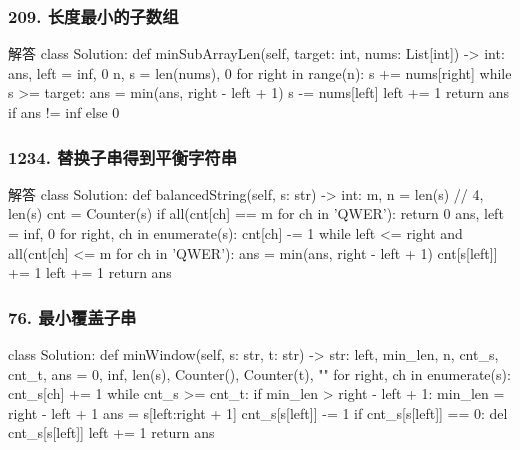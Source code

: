 \begin{frame}[fragile]          %
  \frametitle{\textsc{209. 长度最小的子数组}}
  \begin{codeblock}[language=python]{解答}
class Solution:
  def minSubArrayLen(self, target: int, nums: List[int]) -> int:
    ans, left = inf, 0
    n, s = len(nums), 0
    for right in range(n):
        s += nums[right]
        while s >= target:
            ans = min(ans, right - left + 1)
            s -= nums[left]
            left += 1
    return ans if ans != inf else 0
  \end{codeblock}
\end{frame}

\begin{frame}[fragile]          %
  \frametitle{\textsc{1234. 替换子串得到平衡字符串}}
  \begin{codeblock}[language=python]{解答}
class Solution:
  def balancedString(self, s: str) -> int:
    m, n = len(s) // 4, len(s)
    cnt = Counter(s)
    if all(cnt[ch] == m for ch in 'QWER'):
        return 0
    ans, left = inf, 0
    for right, ch in enumerate(s):
        cnt[ch] -= 1
        while left <= right and all(cnt[ch] <= m for ch in 'QWER'):
            ans = min(ans, right - left + 1)
            cnt[s[left]] += 1
            left += 1
    return ans
  \end{codeblock}
\end{frame}

\begin{frame}[fragile]          %
  \frametitle{\textsc{76. 最小覆盖子串}}
  \begin{codeblock}[language=python]{}
class Solution:
  def minWindow(self, s: str, t: str) -> str:
    left, min_len, n, cnt_s, cnt_t, ans = 0, inf, len(s), Counter(), Counter(t), ""
    for right, ch in enumerate(s):
        cnt_s[ch] += 1
        while cnt_s >= cnt_t:
            if min_len > right - left + 1:
                min_len = right - left + 1
                ans = s[left:right + 1]
            cnt_s[s[left]] -= 1
            if cnt_s[s[left]] == 0:
                del cnt_s[s[left]]
            left += 1
    return ans
  \end{codeblock}
\end{frame}



